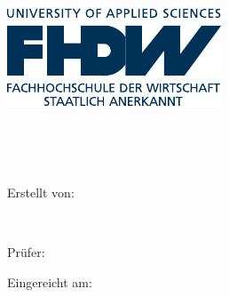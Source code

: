 
\begin{titlepage}

\begin{center}


\includegraphics[scale=1.20]{img/fhdw.pdf}\\

\vspace{.7cm}

\Huge{\bfseries\dokumententyp}

~\vspace{.5cm}\\

\LARGE{\dokumententitel}

~\vspace{1.3cm}\\


\large{

Erstellt von:\\\vspace{1mm}

\dokumentenautor\\

\dokumentenautoradress


\vspace{1.5cm}

Prüfer:\vspace{1mm}\\

\dokumentenpruefer


\vspace{1.5cm}

Eingereicht am:\vspace{1mm}\\

\abgabedatum

}

\end{center}


\end{titlepage}

